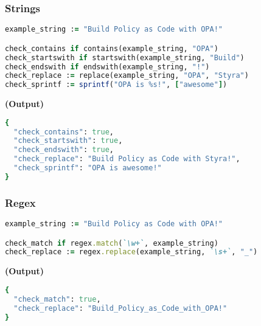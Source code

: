 \documentclass[twocolumn]{article}
\begin{document}
\vspace{-1em}
\subsubsection*{Strings}

\begin{lstlisting}[language=Ruby]
example_string := "Build Policy as Code with OPA!"

check_contains if contains(example_string, "OPA")
check_startswith if startswith(example_string, "Build")
check_endswith if endswith(example_string, "!")
check_replace := replace(example_string, "OPA", "Styra")
check_sprintf := sprintf("OPA is %s!", ["awesome"])
\end{lstlisting}



\textbf{\tiny{(Output)}}
\begin{lstlisting}[language=Ruby]
{
  "check_contains": true,
  "check_startswith": true,
  "check_endswith": true,
  "check_replace": "Build Policy as Code with Styra!",
  "check_sprintf": "OPA is awesome!"
}
\end{lstlisting}



\vspace{-1em}
\subsubsection*{Regex}

\begin{lstlisting}[language=Ruby]
example_string := "Build Policy as Code with OPA!"

check_match if regex.match(`\w+`, example_string)
check_replace := regex.replace(example_string, `\s+`, "_")
\end{lstlisting}



\textbf{\tiny{(Output)}}
\begin{lstlisting}[language=Ruby]
{
  "check_match": true,
  "check_replace": "Build_Policy_as_Code_with_OPA!"
}
\end{lstlisting}
\end{document}
